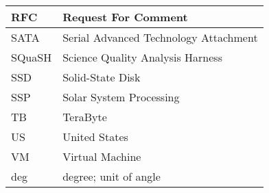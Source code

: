 \begin{longtable}{p{}p{}}
RFC & Request For Comment \\\hline
SATA & Serial Advanced Technology Attachment \\\hline
SQuaSH & Science Quality Analysis Harness \\\hline
SSD & Solid-State Disk \\\hline
SSP & Solar System Processing \\\hline
TB & TeraByte \\\hline
US & United States \\\hline
VM & Virtual Machine \\\hline
deg & degree; unit of angle \\\hline
\end{longtable}
